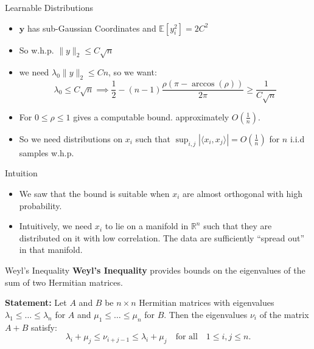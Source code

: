 \documentclass[serif, aspectratio=169]{beamer}
\newcommand{\E}{\mathbb{E}}
\begin{document}
\begin{frame}{Learnable Distributions}
	\begin{itemize}
		\item \(\mathbf{y}\) has sub-Gaussian Coordinates and \(\E[y_i^2] = 2C^2\)
		\item So w.h.p. \(\|y\|_2 \leq C\sqrt{n}\)
		\item we need \(\lambda_0 \|y\|_2 \leq Cn\), so we want:
		\[
		\lambda_0 \leq C\sqrt{n} \implies  \frac{1}{2} - (n-1)\frac{\rho(\pi-\arccos(\rho))}{2\pi} \geq \frac{1}{C\sqrt{n}}
		\]
		\item For \(0 \leq \rho \leq 1\) gives a computable bound. approximately \(O(\frac{1}{n})\).
		\item So we need distributions on \(x_i\) such that \(\sup_{i,j}|\langle x_i, x_j \rangle| = O(\frac{1}{n})\) for \(n\) i.i.d samples w.h.p.
	\end{itemize}
\end{frame}


\begin{frame}{Intuition}
	\begin{itemize}
\item We saw that the bound is suitable  when \(x_i\) are almost orthogonal with high probability.

\item Intuitively, we need \(x_i\) to lie on a manifold in \(\mathbb{R}^n\) such that they are distributed on it with low correlation. The data are sufficiently “spread out” in that manifold.
	\end{itemize}
\end{frame}

\begin{frame}{Weyl's Inequality}
    \textbf{Weyl's Inequality} provides bounds on the eigenvalues of the sum of two Hermitian matrices.

    \vspace{0.5cm}
    
    \textbf{Statement:} Let \( A \) and \( B \) be \( n \times n \) Hermitian matrices with eigenvalues \( \lambda_1 \leq \dots \leq \lambda_n \) for \( A \) and \( \mu_1 \leq \dots \leq \mu_n \) for \( B \). Then the eigenvalues \( \nu_i \) of the matrix \( A + B \) satisfy:
    \[
    \lambda_i + \mu_j \leq \nu_{i+j-1} \leq \lambda_i + \mu_j \quad \text{for all} \quad 1 \leq i,j \leq n.
    \]
\end{frame}
\end{document}
